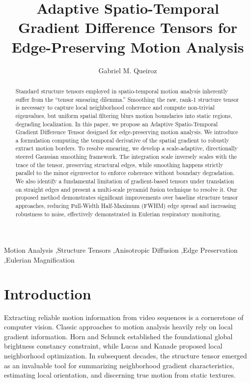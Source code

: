 \documentclass[preprint,12pt]{elsarticle}
\begin{document}
\begin{frontmatter}

\title{Adaptive Spatio-Temporal Gradient Difference Tensors for Edge-Preserving Motion Analysis}

\author{Gabriel M. Queiroz}

\begin{abstract}
Standard structure tensors employed in spatio-temporal motion analysis inherently suffer from the ``tensor smearing dilemma.'' Smoothing the raw, rank-1 structure tensor is necessary to capture local neighborhood coherence and compute non-trivial eigenvalues, but uniform spatial filtering blurs motion boundaries into static regions, degrading localization. In this paper, we propose an Adaptive Spatio-Temporal Gradient Difference Tensor designed for edge-preserving motion analysis. We introduce a formulation computing the temporal derivative of the spatial gradient to robustly extract motion borders. To resolve smearing, we develop a scale-adaptive, directionally steered Gaussian smoothing framework. The integration scale inversely scales with the trace of the tensor, preserving structural edges, while smoothing happens strictly parallel to the minor eigenvector to enforce coherence without boundary degradation. We also identify a fundamental limitation of gradient-based tensors under translation on straight edges and present a multi-scale pyramid fusion technique to resolve it. Our proposed method demonstrates significant improvements over baseline structure tensor approaches, reducing Full-Width Half-Maximum (FWHM) edge spread and increasing robustness to noise, effectively demonstrated in Eulerian respiratory monitoring.
\end{abstract}

\begin{keyword}
Motion Analysis \sep Structure Tensors \sep Anisotropic Diffusion \sep Edge Preservation \sep Eulerian Magnification
\end{keyword}

\end{frontmatter}

\section{Introduction}
\label{sec:intro}
Extracting reliable motion information from video sequences is a cornerstone of computer vision. Classic approaches to motion analysis heavily rely on local gradient information. Horn and Schunck \cite{Horn1981} established the foundational global brightness constancy constraint, while Lucas and Kanade \cite{LucasKanade1981} proposed local neighborhood optimization. In subsequent decades, the structure tensor emerged as an invaluable tool for summarizing neighborhood gradient characteristics, estimating local orientation, and discerning true motion from static textures. 
\end{document}
